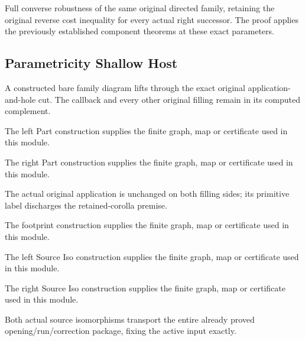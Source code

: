 Full converse robustness of the same original directed family, retaining
the original reverse cost inequality for every actual right successor.
The proof applies the previously established component theorems at these exact parameters.
\par{}

\subsection{Parametricity Shallow Host}
A constructed bare family diagram lifts through the exact original
application-and-hole cut. The callback and every other original filling
remain in its computed complement.

The left Part construction supplies the finite graph, map or certificate used in this module.
\par{}

The right Part construction supplies the finite graph, map or certificate used in this module.
\par{}

The actual original application is unchanged on both filling sides;
its primitive label discharges the retained-corolla premise.
\par{}

The footprint construction supplies the finite graph, map or certificate used in this module.
\par{}

The left Source Iso construction supplies the finite graph, map or certificate used in this module.
\par{}

The right Source Iso construction supplies the finite graph, map or certificate used in this module.
\par{}

Both actual source isomorphisms transport the entire already proved
opening/run/correction package, fixing the active input exactly.
\par{}

